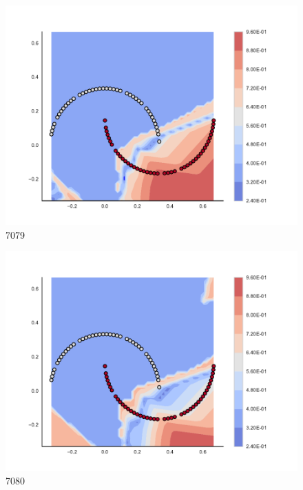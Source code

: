 \begin{subfigure}[b]{0.09\textwidth}
    \includegraphics[clip, trim=2.35cm 1.75cm 4.5cm 0cm,width=\textwidth]{img/convergence/7079.pdf}
    \caption{7079}
    \label{fig:convergence_7079}
\end{subfigure}
%
\begin{subfigure}[b]{0.09\textwidth}
    \includegraphics[clip, trim=2.35cm 1.75cm 4.5cm 0cm,width=\textwidth]{img/convergence/7080.pdf}
    \caption{7080}
    \label{fig:convergence_7080}
\end{subfigure}
%

